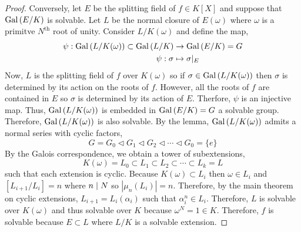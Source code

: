 \documentclass[12pt]{extarticle}
\begin{document}
\begin{proof}
Conversely, let $E$ be the splitting field of $f \in K[X]$ and suppose that $\mathrm{Gal}\left( E/K \right)$ is solvable. Let $L$ be the normal closure of $E(\omega)$ where $\omega$ is a primitve $N^{\mathrm{th}}$ root of unity. Consider $L/K(\omega)$ and define the map,
\begin{align*}
\psi : \mathrm{Gal}\left( L/K(\omega) \right) \subset \mathrm{Gal}\left( L/K \right) & \to \mathrm{Gal}\left( E/K \right) = G \\
\psi : \sigma & \mapsto  \sigma |_E
\end{align*} 
Now, $L$ is the splitting field of $f$ over $K(\omega)$ so if $\sigma \in \mathrm{Gal}\left( L/K(\omega) \right)$ then $\sigma$ is determined by its action on the roots of $f$. However, all the roots of $f$ are contained in $E$ so $\sigma$ is determined by its action of $E$. Therfore, $\psi$ is an injective map. Thus, $\mathrm{Gal}\left( L/K(\omega) \right)$ is embedded in $\mathrm{Gal}\left( E/K \right) = G$ a solvable group. Therefore, $\mathrm{Gal}\left( L/K(\omega) \right)$ is also solvable. By the lemma, $\mathrm{Gal}\left( L/K(\omega) \right)$ admits a normal series with cyclic factors,
\[ G = G_0 \triangleleft G_1 \triangleleft G_2 \triangleleft \cdots \triangleleft G_0 = \{e\}\]  
By the Galois correspondence, we obtain a tower of subextensions,
\[ K(\omega) = L_0 \subset L_1 \subset L_2 \subset \cdots \subset L_k = L\]
such that each extension is cyclic. Because $K(\omega) \subset L_i$ then $\omega \in L_i$ and $[L_{i+1}/L_i] = n$ where $n \mid N$ so $|\mu_n(L_i)| = n$. Therefore, by the main theorem on cyclic extensions, $L_{i + 1} = L_i(\alpha_i)$ such that $\alpha_i^n \in L_i$. Therefore, $L$ is solvable over $K(\omega)$ and thus solvable over $K$ because $\omega^N  = 1 \in K$. Therefore, $f$ is solvable because $E \subset L$ where $L/K$ is a solvable extension.  
\end{proof}

\begin{corollary}

\end{corollary}
\end{document}
